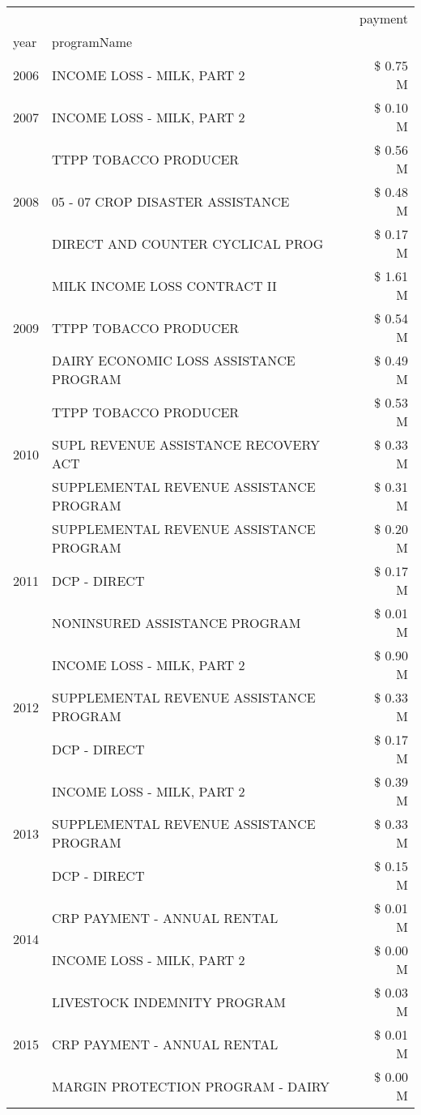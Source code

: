 \begin{tabular}{llr}
\toprule
 &  & payment \\
year & programName &  \\
\midrule
2006 & INCOME LOSS - MILK, PART 2 & \$ 0.75 M \\
\cline{1-3}
2007 & INCOME LOSS - MILK, PART 2 & \$ 0.10 M \\
\cline{1-3}
\multirow[t]{3}{*}{2008} & TTPP TOBACCO PRODUCER & \$ 0.56 M \\
 & 05 - 07 CROP DISASTER ASSISTANCE & \$ 0.48 M \\
 & DIRECT AND COUNTER CYCLICAL PROG & \$ 0.17 M \\
\cline{1-3}
\multirow[t]{3}{*}{2009} & MILK INCOME LOSS CONTRACT II & \$ 1.61 M \\
 & TTPP TOBACCO PRODUCER & \$ 0.54 M \\
 & DAIRY ECONOMIC LOSS ASSISTANCE PROGRAM & \$ 0.49 M \\
\cline{1-3}
\multirow[t]{3}{*}{2010} & TTPP TOBACCO PRODUCER & \$ 0.53 M \\
 & SUPL REVENUE ASSISTANCE RECOVERY ACT & \$ 0.33 M \\
 & SUPPLEMENTAL REVENUE ASSISTANCE PROGRAM & \$ 0.31 M \\
\cline{1-3}
\multirow[t]{3}{*}{2011} & SUPPLEMENTAL REVENUE ASSISTANCE PROGRAM & \$ 0.20 M \\
 & DCP - DIRECT & \$ 0.17 M \\
 & NONINSURED ASSISTANCE PROGRAM & \$ 0.01 M \\
\cline{1-3}
\multirow[t]{3}{*}{2012} & INCOME LOSS - MILK, PART 2 & \$ 0.90 M \\
 & SUPPLEMENTAL REVENUE ASSISTANCE PROGRAM & \$ 0.33 M \\
 & DCP - DIRECT & \$ 0.17 M \\
\cline{1-3}
\multirow[t]{3}{*}{2013} & INCOME LOSS - MILK, PART 2 & \$ 0.39 M \\
 & SUPPLEMENTAL REVENUE ASSISTANCE PROGRAM & \$ 0.33 M \\
 & DCP - DIRECT & \$ 0.15 M \\
\cline{1-3}
\multirow[t]{2}{*}{2014} & CRP PAYMENT - ANNUAL RENTAL & \$ 0.01 M \\
 & INCOME LOSS - MILK, PART 2 & \$ 0.00 M \\
\cline{1-3}
\multirow[t]{3}{*}{2015} & LIVESTOCK INDEMNITY PROGRAM & \$ 0.03 M \\
 & CRP PAYMENT - ANNUAL RENTAL & \$ 0.01 M \\
 & MARGIN PROTECTION PROGRAM - DAIRY & \$ 0.00 M \\

\end{tabular}
